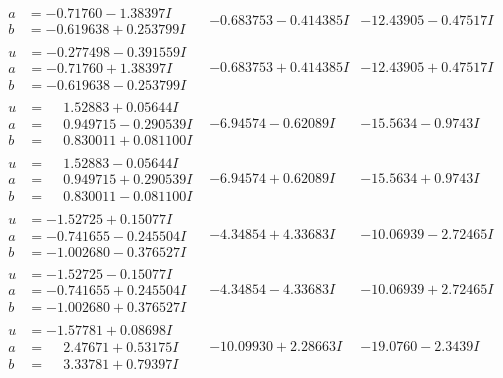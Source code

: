 \documentclass[1p]{elsarticle_modified}
\theoremstyle{definition}
\begin{document}
$$\begin{array}{c|c|c}
\begin{aligned}
a &= -0.71760 - 1.38397 I \\
b &= -0.619638 + 0.253799 I\end{aligned}
 & -0.683753 - 0.414385 I & -12.43905 - 0.47517 I \\ \hline\begin{aligned}
u &= -0.277498 - 0.391559 I \\
a &= -0.71760 + 1.38397 I \\
b &= -0.619638 - 0.253799 I\end{aligned}
 & -0.683753 + 0.414385 I & -12.43905 + 0.47517 I \\ \hline\begin{aligned}
u &= \phantom{-}1.52883 + 0.05644 I \\
a &= \phantom{-}0.949715 - 0.290539 I \\
b &= \phantom{-}0.830011 + 0.081100 I\end{aligned}
 & -6.94574 - 0.62089 I & -15.5634 - 0.9743 I \\ \hline\begin{aligned}
u &= \phantom{-}1.52883 - 0.05644 I \\
a &= \phantom{-}0.949715 + 0.290539 I \\
b &= \phantom{-}0.830011 - 0.081100 I\end{aligned}
 & -6.94574 + 0.62089 I & -15.5634 + 0.9743 I \\ \hline\begin{aligned}
u &= -1.52725 + 0.15077 I \\
a &= -0.741655 - 0.245504 I \\
b &= -1.002680 - 0.376527 I\end{aligned}
 & -4.34854 + 4.33683 I & -10.06939 - 2.72465 I \\ \hline\begin{aligned}
u &= -1.52725 - 0.15077 I \\
a &= -0.741655 + 0.245504 I \\
b &= -1.002680 + 0.376527 I\end{aligned}
 & -4.34854 - 4.33683 I & -10.06939 + 2.72465 I \\ \hline\begin{aligned}
u &= -1.57781 + 0.08698 I \\
a &= \phantom{-}2.47671 + 0.53175 I \\
b &= \phantom{-}3.33781 + 0.79397 I\end{aligned}
 & -10.09930 + 2.28663 I & -19.0760 - 2.3439 I \\ \hline\begin{aligned}

\end{aligned}
\end{array}$$
\end{document}
